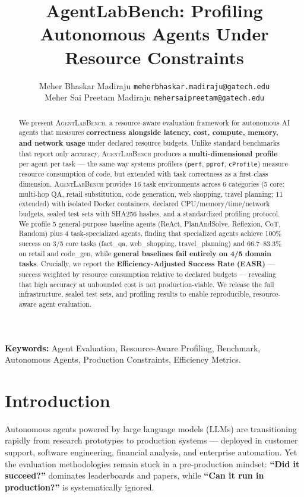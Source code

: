 \documentclass[letterpaper, 10 pt, conference]{ieeeconf}
\title{\LARGE \bf AgentLabBench: Profiling Autonomous Agents Under Resource Constraints}
\author{ \parbox{3 in}{ \centering Meher Bhaskar Madiraju
        {\tt\small meherbhaskar.madiraju@gatech.edu}}
        \hspace*{ 0.5 in}
        \parbox{3 in}{\centering Meher Sai Preetam Madiraju
        {\tt\small mehersaipreetam@gatech.edu}}
}
\newcommand{\agentslabench}{\textsc{AgentLabBench}}
\newcommand{\easr}{\textsc{EASR}}
\begin{document}
\maketitle
\thispagestyle{empty}
\pagestyle{empty}

\begin{abstract}
We present \agentslabench{}, a resource-aware evaluation framework for autonomous AI agents that measures \textbf{correctness alongside latency, cost, compute, memory, and network usage} under declared resource budgets. Unlike standard benchmarks that report only accuracy, \agentslabench{} produces a \textbf{multi-dimensional profile} per agent per task --- the same way systems profilers (\texttt{perf}, \texttt{pprof}, \texttt{cProfile}) measure resource consumption of code, but extended with task correctness as a first-class dimension. \agentslabench{} provides 16 task environments across 6 categories (5 core: multi-hop QA, retail substitution, code generation, web shopping, travel planning; 11 extended) with isolated Docker containers, declared CPU/memory/time/network budgets, sealed test sets with SHA256 hashes, and a standardized profiling protocol. We profile 5 general-purpose baseline agents (ReAct, PlanAndSolve, Reflexion, CoT, Random) plus 4 task-specialized agents, finding that specialized agents achieve 100\% success on 3/5 core tasks (fact\_qa, web\_shopping, travel\_planning) and 66.7--83.3\% on retail and code\_gen, while \textbf{general baselines fail entirely on 4/5 domain tasks}. Crucially, we report the \textbf{Efficiency-Adjusted Success Rate (\easr{})} --- success weighted by resource consumption relative to declared budgets --- revealing that high accuracy at unbounded cost is not production-viable. We release the full infrastructure, sealed test sets, and profiling results to enable reproducible, resource-aware agent evaluation.
\end{abstract}

\textbf{Keywords:} Agent Evaluation, Resource-Aware Profiling, Benchmark, Autonomous Agents, Production Constraints, Efficiency Metrics.

\section{Introduction}
\label{sec:intro}

Autonomous agents powered by large language models (LLMs) are transitioning rapidly from research prototypes to production systems --- deployed in customer support, software engineering, financial analysis, and enterprise automation. Yet the evaluation methodologies remain stuck in a pre-production mindset: \textbf{``Did it succeed?''} dominates leaderboards and papers, while \textbf{``Can it run in production?''} is systematically ignored.
\end{document}
